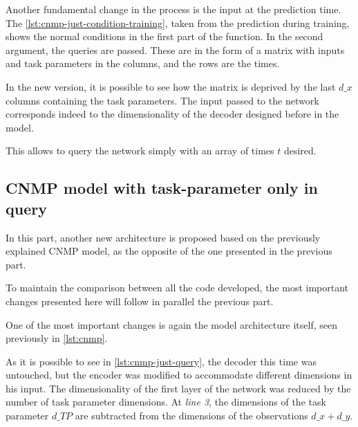 

Another fundamental change in the process is the input at the prediction time. The \cref{lst:cnmp-just-condition-training}, taken from the prediction during training, shows the normal conditions in the first part of the function. In the second argument, the queries are passed. These are in the form of a matrix with inputs and task parameters in the columns, and the rows are the times.

In the new version, it is possible to see how the matrix is deprived by the last $d\_x$ columns containing the task parameters. The input passed to the network corresponds indeed to the dimensionality of the decoder designed before in the model.

This allows to query the network simply with an array of times $t$ desired. 



\subsection{CNMP model with task-parameter only in query}
In this part, another new architecture is proposed based on the previously explained CNMP model, as the opposite of the one presented in the previous part.

To maintain the comparison between all the code developed, the most important changes presented here will follow in parallel the previous part. 

One of the most important changes is again the model architecture itself, seen previously in \cref{lst:cnmp}.  



As it is possible to see in \cref{lst:cnmp-just-query}, the decoder this time was untouched, but the encoder was modified to accommodate different dimensions in his input. The dimensionality of the first layer of the network was reduced by the number of task parameter dimensions. At \emph{line 3}, the dimensions of the task parameter $d\_TP$ are subtracted from the dimensions of the observations $d\_x+d\_y$.



